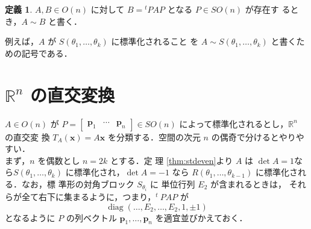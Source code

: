 \documentclass[11pt, uplatex, dvipdfmx, titlepage]{jsarticle}
\newcommand{\trs}[1]{{}^{t}~\!\!#1}
\DeclareMathOperator{\diag}{diag}
\theoremstyle{definition}
\newtheorem*{definition}{定義}
\begin{document}
\begin{definition}
  $A, B \in O(n)$ に対して $B={}^{t}PAP$ となる $P \in SO(n)$ が存在す
  るとき，$A \sim B$ と書く．
\end{definition}

例えば，$A$ が $S(\theta_1, \ldots, \theta_k)$ に標準化されること
を $A \sim S(\theta_1, \ldots, \theta_k)$ と書くための記号である．

\newpage
\section{$\mathbb{R}^n$ の直交変換}

$A \in O(n)$ が $P =\left[
  \begin{array}{ccc}
    \bm{p}_1 & \cdots & \bm{p}_n
  \end{array}
\right] \in SO(n)$ によって標準化されるとし，$\mathbb{R}^n$ の直交変
換 $T_A(\bm{x}) = A\bm{x}$ を分類する．空間の次元 $n$ の偶奇で分けるとやりやすい．\\


まず，$n$ を偶数とし $n=2k$ とする．定
理 \ref{thm:stdeven}より $A$ は $\det
A=1$なら$S(\theta_1, \ldots, \theta_k)$ に標準化され，$\det A
=-1$ なら $R(\theta_1, \ldots, \theta_{k-1})$ に標準化される．なお，標
準形の対角ブロック $S_{\theta_i}$ に 単位行列 $E_2$ が含まれるときは，
それらが全て右下に集まるように，つまり，$\trs{P}AP$ が
\[
  \diag( \ldots, E_{2}, \dots, E_2, 1, \pm 1)
\]
となるように $P$ の列ベクトル $\bm{p}_1, \ldots, \bm{p}_n$ を適宜並びかえておく．
\end{document}
